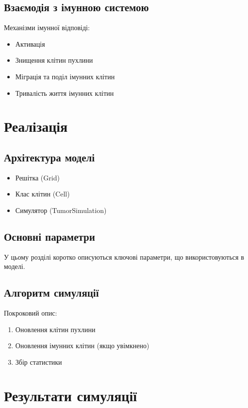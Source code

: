 \documentclass{article}
\begin{document}
\subsection{Взаємодія з імунною системою}
Механізми імунної відповіді:
\begin{itemize}
    \item Активація
    \item Знищення клітин пухлини
    \item Міграція та поділ імунних клітин
    \item Тривалість життя імунних клітин
\end{itemize}

\section{Реалізація}
\subsection{Архітектура моделі}
\begin{itemize}
    \item Решітка (Grid)
    \item Клас клітин (Cell)
    \item Симулятор (TumorSimulation)
\end{itemize}

\subsection{Основні параметри}

У цьому розділі коротко описуються ключові параметри, що використовуються в моделі.

\subsection{Алгоритм симуляції}
Покроковий опис:
\begin{enumerate}
    \item Оновлення клітин пухлини
    \item Оновлення імунних клітин (якщо увімкнено)
    \item Збір статистики
\end{enumerate}

\section{Результати симуляції}
\end{document}
